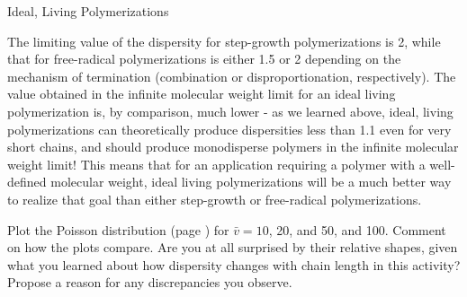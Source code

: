 \begin{activity}{Ideal, Living Polymerizations}
\begin{ctqs}
		\begin{solution}[1.5in]
			The limiting value of the dispersity for step-growth polymerizations is 2, while that for free-radical polymerizations is either 1.5 or 2 depending on the mechanism of termination (combination or disproportionation, respectively).  The value obtained in the infinite molecular weight limit for an ideal living polymerization is, by comparison, much lower - as we learned above, ideal, living polymerizations can theoretically produce dispersities less than 1.1 even for very short chains,  and should produce monodisperse polymers in the infinite molecular weight limit!  This means that for an application requiring a polymer with a well-defined molecular weight, ideal living polymerizations will be a much better way to realize that goal than either step-growth or free-radical polymerizations.
		\end{solution}
	
\end{ctqs}



\begin{exercises}

	\exercise Plot the Poisson distribution (page \pageref{\labelbase:infobox:poisson}) for $\bar v = 10$, 20, and 50, and 100.  Comment on how the plots compare.  Are you at all surprised by their relative shapes, given what you learned about how dispersity changes with chain length in this activity?  Propose a reason for any discrepancies you observe.
	
		\begin{solution}\end{solution}
	

\end{exercises}
\end{activity}
